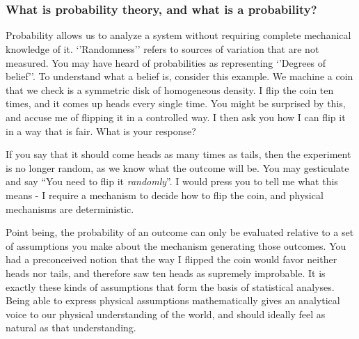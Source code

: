 \documentclass[11pt,a4paper,article]{memoir} %
\begin{document}
\newpage



\newpage
\appendix
\chapter{}
\subsection{What is probability theory, and what is a probability?}
Probability allows us to analyze a system without requiring complete mechanical knowledge of it. `'Randomness'' refers to sources of variation that are not measured. You may have heard of probabilities as representing `'Degrees of belief''. To understand what a belief is, consider this example. We machine a coin that we check is a symmetric disk of homogeneous density. I flip the coin ten times, and it comes up heads every single time. You might be surprised by this, and accuse me of flipping it in a controlled way. I then ask you how I can flip it in a way that is fair. What is your response?
\par
If you say that it should come heads as many times as tails, then the experiment is no longer random, as we know what the outcome will be. You may gesticulate and say ``You need to flip it \emph{randomly}''. I would press you to tell me what this means - I require a mechanism to decide how to flip the coin, and physical mechanisms are deterministic.
\par
Point being, the probability of an outcome can only be evaluated relative to a set of assumptions you make about the mechanism generating those outcomes. You had a preconceived notion that the way I flipped the coin would favor neither heads nor tails, and therefore saw ten heads as supremely improbable. It is exactly these kinds of assumptions that form the basis of statistical analyses. Being able to express physical assumptions mathematically gives an analytical voice to our physical understanding of the world, and should ideally feel as natural as that understanding.
\newpage
\end{document}
